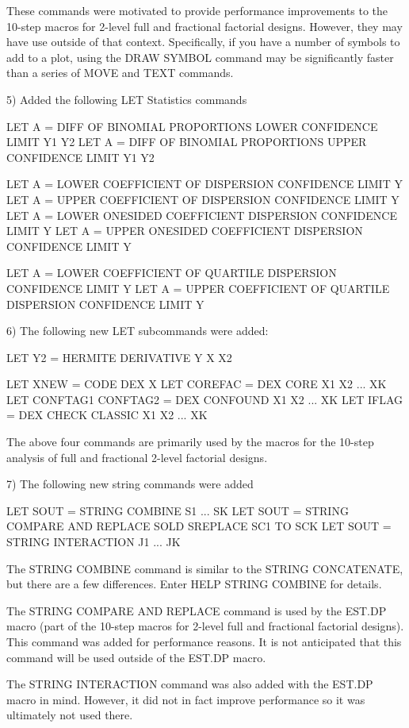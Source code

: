     These commands were motivated to provide performance improvements to
    the 10-step macros for 2-level full and fractional factorial designs.
    However, they may have use outside of that context.  Specifically,
    if you have a number of symbols to add to a plot, using the
    DRAW SYMBOL command may be significantly faster than a series of
    MOVE and TEXT commands.

 5) Added the following LET Statistics commands

       LET A = DIFF OF BINOMIAL PROPORTIONS LOWER CONFIDENCE LIMIT Y1 Y2
       LET A = DIFF OF BINOMIAL PROPORTIONS UPPER CONFIDENCE LIMIT Y1 Y2

       LET A = LOWER COEFFICIENT OF DISPERSION CONFIDENCE LIMIT Y
       LET A = UPPER COEFFICIENT OF DISPERSION CONFIDENCE LIMIT Y
       LET A = LOWER ONESIDED COEFFICIENT DISPERSION CONFIDENCE LIMIT Y
       LET A = UPPER ONESIDED COEFFICIENT DISPERSION CONFIDENCE LIMIT Y

       LET A = LOWER COEFFICIENT OF QUARTILE DISPERSION CONFIDENCE LIMIT Y
       LET A = UPPER COEFFICIENT OF QUARTILE DISPERSION CONFIDENCE LIMIT Y

 6) The following new LET subcommands were added:

       LET Y2 = HERMITE DERIVATIVE Y X X2

       LET XNEW = CODE DEX X
       LET COREFAC = DEX CORE X1 X2 ... XK
       LET CONFTAG1 CONFTAG2 = DEX CONFOUND X1 X2 ... XK
       LET IFLAG = DEX CHECK CLASSIC X1 X2 ... XK

    The above four commands are primarily used by the macros for the
    10-step analysis of full and fractional 2-level factorial designs.

 7) The following new string commands were added

       LET SOUT = STRING COMBINE S1 ... SK
       LET SOUT = STRING COMPARE AND REPLACE SOLD SREPLACE SC1 TO SCK
       LET SOUT = STRING INTERACTION J1 ... JK

    The STRING COMBINE command is similar to the STRING CONCATENATE, but
    there are a few differences.  Enter HELP STRING COMBINE for details.

    The STRING COMPARE AND REPLACE command is used by the EST.DP macro
    (part of the 10-step macros for 2-level full and fractional factorial
    designs).  This command was added for performance reasons.  It is not
    anticipated that this command will be used outside of the EST.DP macro.

    The STRING INTERACTION command was also added with the EST.DP macro
    in mind.  However, it did not in fact improve performance so it was
    ultimately not used there.

